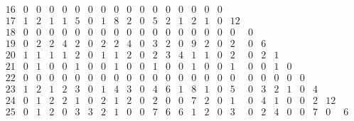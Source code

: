 \begin{landscape}
\[\begin{array}{c|ccccccccccccccccccccccccc}
16&  0&  0&  0&  0&  0&  0&  0&  0&  0&  0&  0&  0&  0&  0&  0&  0&   &   &   &   &   &   &   &   &   \\
17&  1&  2&  1&  1&  5&  0&  1&  8&  2&  0&  5&  2&  1&  2&  1&  0& 12&   &   &   &   &   &   &   &   \\
18&  0&  0&  0&  0&  0&  0&  0&  0&  0&  0&  0&  0&  0&  0&  0&  0&  0&  0&   &   &   &   &   &   &   \\
19&  0&  2&  2&  4&  2&  0&  2&  2&  4&  0&  3&  2&  0&  9&  2&  0&  2&  0&  6&   &   &   &   &   &   \\
20&  1&  1&  1&  1&  2&  0&  1&  1&  2&  0&  2&  3&  4&  1&  1&  0&  2&  0&  2&  1&   &   &   &   &   \\
21&  0&  1&  0&  0&  1&  0&  0&  1&  0&  0&  1&  0&  0&  1&  0&  0&  1&  0&  0&  1&  0&   &   &   &   \\
22&  0&  0&  0&  0&  0&  0&  0&  0&  0&  0&  0&  0&  0&  0&  0&  0&  0&  0&  0&  0&  0&  0&   &   &   \\
23&  1&  2&  1&  2&  3&  0&  1&  4&  3&  0&  4&  6&  1&  8&  1&  0&  5&  0&  3&  2&  1&  0&  4&   &   \\
24&  0&  1&  2&  2&  1&  0&  2&  1&  2&  0&  2&  0&  0&  7&  2&  0&  1&  0&  4&  1&  0&  0&  2& 12&   \\
25&  0&  1&  2&  0&  3&  3&  2&  1&  0&  0&  7&  6&  6&  1&  2&  0&  3&  0&  2&  4&  0&  0&  7&  0&  6\\
\end{array}
\]


\end{landscape}
